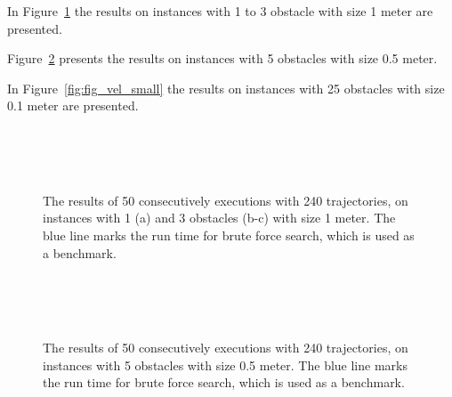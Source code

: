 In Figure~\ref{fig:fig_vel_big} the results on instances with 1 to 3 obstacle with size 1 meter are presented. 

Figure~\ref{fig:fig_vel_medium} presents the results on instances with 5 obstacles with size 0.5 meter.  

In Figure~\ref{fig:fig_vel_small} the results on instances with 25 obstacles with size 0.1 meter are presented.

\begin{figure}[thpb]
   \myfloatalign
    \tiny
          \centering
    \\
    \\
    \\
    {
    \captionsetup[subfigure]{labelformat=empty} 
    }
    \caption[Experiment: Big obstacle instances with different velocity bounds]{The results of 50 consecutively executions with 240 trajectories, on instances with 1 (a) and 3 obstacles (b-c) with size 1 meter. The blue line marks the run time for brute force search, which is used as a benchmark.}  
     \label{fig:fig_vel_big}
\end{figure}

\begin{figure}[thpb]
   \myfloatalign
    \tiny
          \centering
    \\
    \\
    \\
    {
    \captionsetup[subfigure]{labelformat=empty} 
    }
    \caption[Experiment: Medium obstacle instances with different velocity bounds]{The results of 50 consecutively executions with 240 trajectories, on instances with 5 obstacles with size 0.5 meter. The blue line marks the run time for brute force search, which is used as a benchmark.}  
     \label{fig:fig_vel_medium}
\end{figure} 


